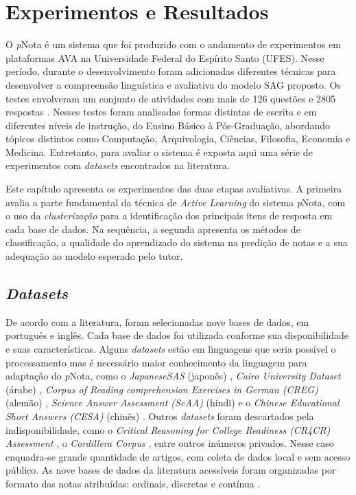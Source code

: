 \chapter{Experimentos e Resultados}
\label{cap-experimentos}

O \textit{p}Nota é um sistema que foi produzido com o andamento de experimentos em plataformas AVA na Universidade Federal do Espírito Santo (UFES). Nesse período, durante o desenvolvimento foram adicionadas diferentes técnicas para desenvolver a compreensão linguística e avaliativa do modelo SAG proposto. Os testes envolveram um conjunto de atividades com mais de 126 questões e 2805 respostas \cite{spalenza2016a}. Nesses testes foram analisadas formas distintas de escrita e em diferentes níveis de instrução, do Ensino Básico à Pós-Graduação, abordando tópicos distintos como Computação, Arquivologia, Ciências, Filosofia, Economia e Medicina. Entretanto, para avaliar o sistema é exposta aqui uma série de experimentos com \textit{datasets} encontrados na literatura.

Este capítulo apresenta os experimentos das duas etapas avaliativas. A primeira avalia a parte fundamental da técnica de \textit{Active Learning} do sistema \textit{p}Nota, com o uso da \textit{clusterização} para a identificação dos principais itens de resposta em cada base de dados. Na sequência, a segunda apresenta os métodos de classificação, a qualidade do aprendizado do sistema na predição de notas e a sua adequação ao modelo esperado pelo tutor.

\section{\textit{Datasets}}

De acordo com a literatura, foram selecionadas nove bases de dados, em português e inglês. Cada base de dados foi utilizada conforme sua disponibilidade e suas características. Alguns \textit{datasets} estão em linguagens que seria possível o processamento mas é necessário maior conhecimento da linguagem para adaptação do \textit{p}Nota, como o \textit{JapaneseSAS} (japonês) \cite{ishioka2017}, \textit{Cairo University Dataset} (árabe) \cite{gomaa2019}, \textit{Corpus of Reading comprehension Exercises in German (CREG)} (alemão) \cite{ziai2012}, \textit{Science Answer Assessment (ScAA)} (hindi) \cite{agarwal2020} e o \textit{Chinese Educational Short Answers (CESA)} (chinês) \cite{ding2020}. Outros \textit{datasets} foram descartados pela indisponibilidade, como o \textit{Critical Reasoning for College Readiness (CR4CR) Assessment} \cite{condor2021}, o \textit{Cordillera Corpus} \cite{zhang2020}, entre outros inúmeros privados. Nesse caso enquadra-se grande quantidade de artigos, com coleta de dados local e sem acesso público. As nove bases de dados da literatura acessíveis foram organizadas por formato das notas atribuídas: ordinais, discretas e contínua \cite{morettin2010}. 

